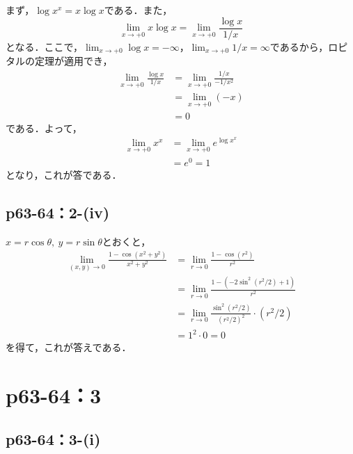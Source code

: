 \documentclass[a4paper,10pt,fleqn]{ltjsarticle}
\begin{document}
\begin{tleftbar}
    まず，$\log x^x = x \log x$である．また，
    \[
        \lim_{x \to +0} x \log x  =\lim_{x \to +0} \frac{\log x}{1/x} 
    \]
    となる．ここで，$\lim_{x \to +0} \log x = -\infty$，$\lim_{x \to +0} 1/x =\infty$であるから，ロピタルの定理が適用でき，
    \begin{align*}
        \lim_{x \to +0} \frac{\log x}{1/x} & = \lim_{x \to +0} \frac{1/x}{-1/x^2} \\
        & = \lim_{x \to +0} (-x) \\
        & =0
    \end{align*}
    である．よって，
    \begin{align*}
    \lim_{x \to +0} x^x &= \lim_{x \to +0} e^{\log x^x} \\
    & =e^0 =1
    \end{align*}
    となり，これが答である．
\end{tleftbar}

\subsection*{p63-64：2-(iv)}

\begin{tleftbar}
    $x=r \cos \theta,~y=r\sin \theta$とおくと，
    \begin{align*}
        \lim_{(x,y)\to 0} \frac{1-\cos (x^2+y^2)}{x^2+y^2} & = \lim_{r \to 0} \frac{1-\cos (r^2)}{r^2} \\
        & =\lim_{r \to 0} \frac{1-(-2\sin ^2 (r^2/2)+1)}{r^2} \\
        & =\lim_{r \to 0} \frac{\sin ^2 (r^2/2)}{(r^2/2)^2} \cdot (r^2/2) \\
        & = 1^2 \cdot 0 =0
    \end{align*}
    を得て，これが答えである．
\end{tleftbar}


\section*{p63-64：3}


\subsection*{p63-64：3-(i)}
\end{document}
